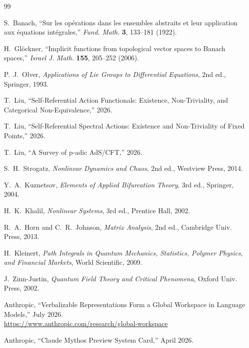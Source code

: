 \documentclass[12pt,a4paper]{article}
\theoremstyle{definition}
\begin{document}
\begin{thebibliography}{99}

S.~Banach, ``Sur les op\'erations dans les ensembles abstraits et leur application aux \'equations int\'egrales,''
\textit{Fund. Math.} \textbf{3}, 133--181 (1922).

H.~Gl\"ockner, ``Implicit functions from topological vector spaces to Banach spaces,''
\textit{Israel J. Math.} \textbf{155}, 205--252 (2006).

P.~J.~Olver, \textit{Applications of Lie Groups to Differential Equations},
2nd ed., Springer, 1993.

T.~Liu, ``Self-Referential Action Functionals: Existence, Non-Triviality, and Categorical Non-Equivalence,'' 2026.

T.~Liu, ``Self-Referential Spectral Actions: Existence and Non-Triviality of Fixed Points,'' 2026.

T.~Liu, ``A Survey of p-adic AdS/CFT,'' 2026.

S.~H.~Strogatz, \textit{Nonlinear Dynamics and Chaos}, 2nd ed., Westview Press, 2014.

Y.~A.~Kuznetsov, \textit{Elements of Applied Bifurcation Theory}, 3rd ed., Springer, 2004.

H.~K.~Khalil, \textit{Nonlinear Systems}, 3rd ed., Prentice Hall, 2002.

R.~A.~Horn and C.~R.~Johnson, \textit{Matrix Analysis}, 2nd ed., Cambridge Univ. Press, 2013.

H.~Kleinert, \textit{Path Integrals in Quantum Mechanics, Statistics, Polymer Physics, and Financial Markets}, World Scientific, 2009.

J.~Zinn-Justin, \textit{Quantum Field Theory and Critical Phenomena}, Oxford Univ. Press, 2002.

Anthropic, ``Verbalizable Representations Form a Global Workspace in Language Models,'' July 2026.\\
\url{https://www.anthropic.com/research/global-workspace}

Anthropic, ``Claude Mythos Preview System Card,'' April 2026.

\end{thebibliography}
\end{document}
